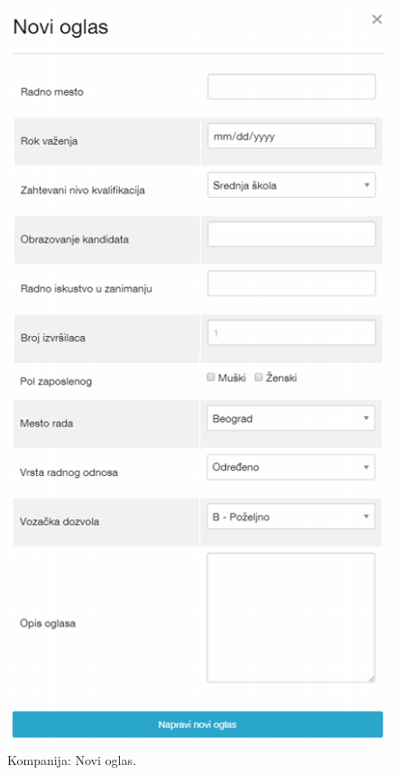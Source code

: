 \begin{figure}[H]
	\centering
	\includegraphics[height=0.95\textheight]{korisnicki-interfejs/slike/k-noviOglas.png}
	\caption{Kompanija: Novi oglas.}
	\label{for: k-noviOglas}
\end{figure}


